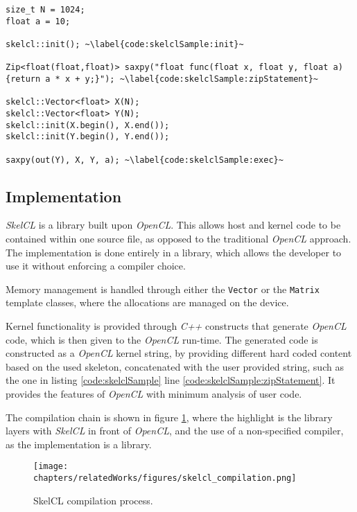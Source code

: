 \begin{lstlisting}[caption={The \textit{SAXPY} computation in \textit{SkelCL}.}, label=code:skelclSample] 
size_t N = 1024;
float a = 10;

skelcl::init(); ~\label{code:skelclSample:init}~

Zip<float(float,float)> saxpy("float func(float x, float y, float a){return a * x + y;}"); ~\label{code:skelclSample:zipStatement}~

skelcl::Vector<float> X(N);      
skelcl::Vector<float> Y(N);
skelcl::init(X.begin(), X.end()); 
skelcl::init(Y.begin(), Y.end());

saxpy(out(Y), X, Y, a); ~\label{code:skelclSample:exec}~
\end{lstlisting}

\subsection{Implementation}
\textit{SkelCL} is a library built upon \textit{OpenCL}. This allows host and kernel code to be contained within one source file, as opposed to the traditional \textit{OpenCL} approach.
The implementation is done entirely in a library, which allows the developer to use it without enforcing a compiler choice.

Memory management is handled through either the \texttt{Vector} or the \texttt{Matrix} template classes, where the allocations are managed on the device.

Kernel functionality is provided through \textit{C++} constructs that generate \textit{OpenCL} code, which is then given to the \textit{OpenCL} run-time. The generated code is constructed as a \textit{OpenCL} kernel string, by providing different hard coded content based on the used skeleton, concatenated with the user provided string, such as the one in listing \ref{code:skelclSample} line \ref{code:skelclSample:zipStatement}. It provides the features of \textit{OpenCL} with minimum analysis of user code.

The compilation chain is shown in figure \ref{fig:skelclCompilation}, where the highlight is the library layers with \textit{SkelCL} in front of \textit{OpenCL}, and the use of a non-specified compiler, as the implementation is a library.
\begin{figure}[H]
\center
\texttt{[image: chapters/relatedWorks/figures/skelcl\_compilation.png]}
\caption{SkelCL compilation process.}
\label{fig:skelclCompilation}
\end{figure}


